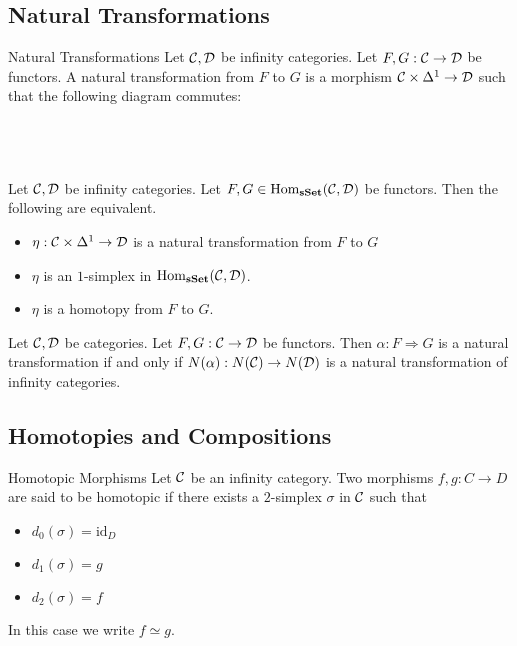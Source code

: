\documentclass[a4paper]{article}
\begin{document}
\subsection{Natural Transformations}
\begin{defn}{Natural Transformations}{} Let $\mathcal{C},\mathcal{D}$ be infinity categories. Let $F,G:\mathcal{C}\to\mathcal{D}$ be functors. A natural transformation from $F$ to $G$ is a morphism $\mathcal{C}\times\Delta^1\to\mathcal{D}$ such that the following diagram commutes: \\~\\
\\~\\
\end{defn}

\begin{lmm}{}{} Let $\mathcal{C},\mathcal{D}$ be infinity categories. Let $F,G\in\operatorname{Hom}_\bold{sSet}(\mathcal{C},\mathcal{D})$ be functors. Then the following are equivalent. 
\begin{itemize}
\item $\eta:\mathcal{C}\times\Delta^1\to\mathcal{D}$ is a natural transformation from $F$ to $G$
\item $\eta$ is an $1$-simplex in $\operatorname{Hom}_\bold{sSet}(\mathcal{C},\mathcal{D})$. 
\item $\eta$ is a homotopy from $F$ to $G$. 
\end{itemize}
\end{lmm}

\begin{lmm}{}{} Let $\mathcal{C},\mathcal{D}$ be categories. Let $F,G:\mathcal{C}\to\mathcal{D}$ be functors. Then $\alpha:F\Rightarrow G$ is a natural transformation if and only if $N(\alpha):N(\mathcal{C})\to N(\mathcal{D})$ is a natural transformation of infinity categories. 
\end{lmm}

\subsection{Homotopies and Compositions}
\begin{defn}{Homotopic Morphisms}{} Let $\mathcal{C}$ be an infinity category. Two morphisms $f,g:C\to D$ are said to be homotopic if there exists a $2$-simplex $\sigma$ in $\mathcal{C}$ such that 
\begin{itemize}
\item $d_0(\sigma)=\text{id}_D$
\item $d_1(\sigma)=g$
\item $d_2(\sigma)=f$
\end{itemize}
In this case we write $f\simeq g$. 
\end{defn}
\end{document}
